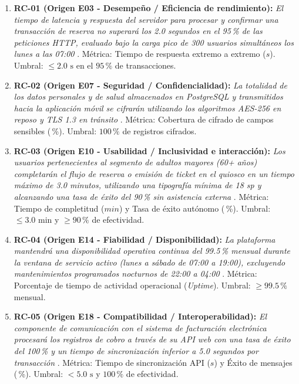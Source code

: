 \documentclass[11pt,a4paper]{article}
\begin{document}
	\begin{enumerate}[leftmargin=*, itemsep=4pt]
		\item \textbf{RC-01 (Origen E03 - Desempeño / Eficiencia de rendimiento):} \textit{\guillemotleft El tiempo de latencia y respuesta del servidor para procesar y confirmar una transacción de reserva no superará los 2.0 segundos en el 95\,\% de las peticiones HTTP, evaluado bajo la carga pico de 300 usuarios simultáneos los lunes a las 07:00\guillemotright} \cite{iso25010, bass2021}. Métrica: Tiempo de respuesta extremo a extremo ($s$). Umbral: $\le 2.0\text{ s}$ en el $95\,\%$ de transacciones.
		\item \textbf{RC-02 (Origen E07 - Seguridad / Confidencialidad):} \textit{\guillemotleft La totalidad de los datos personales y de salud almacenados en PostgreSQL y transmitidos hacia la aplicación móvil se cifrarán utilizando los algoritmos AES-256 en reposo y TLS 1.3 en tránsito\guillemotright} \cite{iso25010, ecuador2021, stallings2017}. Métrica: Cobertura de cifrado de campos sensibles (\,\%). Umbral: $100\,\%$ de registros cifrados.
		\item \textbf{RC-03 (Origen E10 - Usabilidad / Inclusividad e interacción):} \textit{\guillemotleft Los usuarios pertenecientes al segmento de adultos mayores (60+ años) completarán el flujo de reserva o emisión de ticket en el quiosco en un tiempo máximo de 3.0 minutos, utilizando una tipografía mínima de 18 sp y alcanzando una tasa de éxito del 90\,\% sin asistencia externa\guillemotright} \cite{iso25010, nielsen1994}. Métrica: Tiempo de completitud ($min$) y Tasa de éxito autónomo (\,\%). Umbral: $\le 3.0\text{ min}$ y $\ge 90\,\%$ de efectividad.
		\item \textbf{RC-04 (Origen E14 - Fiabilidad / Disponibilidad):} \textit{\guillemotleft La plataforma mantendrá una disponibilidad operativa continua del 99.5\,\% mensual durante la ventana de servicio activo (lunes a sábado de 07:00 a 19:00), excluyendo mantenimientos programados nocturnos de 22:00 a 04:00\guillemotright} \cite{iso25010, sommerville2019}. Métrica: Porcentaje de tiempo de actividad operacional (\textit{Uptime}). Umbral: $\ge 99.5\,\%$ mensual.
		\item \textbf{RC-05 (Origen E18 - Compatibilidad / Interoperabilidad):} \textit{\guillemotleft El componente de comunicación con el sistema de facturación electrónica procesará los registros de cobro a través de su API web con una tasa de éxito del 100\,\% y un tiempo de sincronización inferior a 5.0 segundos por transacción\guillemotright} \cite{iso25010, fielding2000}. Métrica: Tiempo de sincronización API ($s$) y Éxito de mensajes (\,\%). Umbral: $< 5.0\text{ s}$ y $100\,\%$ de efectividad.
	\end{enumerate}
	
\end{document}
